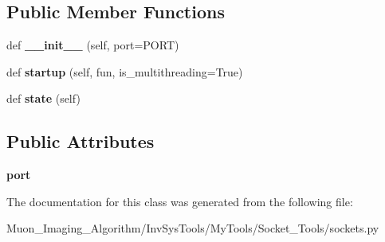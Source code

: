 \subsection*{Public Member Functions}
\begin{DoxyCompactItemize}
\item 
\mbox{\label{classMIS_1_1Muon__Imaging__Algorithm_1_1InvSysTools_1_1MyTools_1_1Socket__Tools_1_1sockets_1_1SocketServer_a834fcf5148c4636c7bc4e030155cd241}} 
def {\bfseries \+\_\+\+\_\+init\+\_\+\+\_\+} (self, port=P\+O\+RT)
\item 
\mbox{\label{classMIS_1_1Muon__Imaging__Algorithm_1_1InvSysTools_1_1MyTools_1_1Socket__Tools_1_1sockets_1_1SocketServer_a139f02b6a256d8b58ce7e7c482bea781}} 
def {\bfseries startup} (self, fun, is\+\_\+multithreading=True)
\item 
\mbox{\label{classMIS_1_1Muon__Imaging__Algorithm_1_1InvSysTools_1_1MyTools_1_1Socket__Tools_1_1sockets_1_1SocketServer_a0a557441c52b8db012e14ce54654f91c}} 
def {\bfseries state} (self)
\end{DoxyCompactItemize}
\subsection*{Public Attributes}
\begin{DoxyCompactItemize}
\item 
\mbox{\label{classMIS_1_1Muon__Imaging__Algorithm_1_1InvSysTools_1_1MyTools_1_1Socket__Tools_1_1sockets_1_1SocketServer_a12702e1ee7d9a4459892aa96f2c03649}} 
{\bfseries port}
\end{DoxyCompactItemize}


The documentation for this class was generated from the following file\+:\begin{DoxyCompactItemize}
\item 
Muon\+\_\+\+Imaging\+\_\+\+Algorithm/\+Inv\+Sys\+Tools/\+My\+Tools/\+Socket\+\_\+\+Tools/sockets.\+py\end{DoxyCompactItemize}
